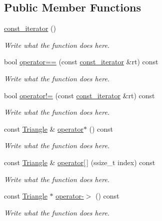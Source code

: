\subsection*{Public Member Functions}
\begin{DoxyCompactItemize}
\item 
\hyperlink{classMesh__t_1_1const__iterator_a12b40b43154b6bed604ee50cf9baa7b6}{const\+\_\+iterator} ()
\begin{DoxyCompactList}\small\item\em Write what the function does here. \end{DoxyCompactList}\item 
bool \hyperlink{classMesh__t_1_1const__iterator_a9f420a6682f245fe125134ff77c79ceb}{operator==} (const \hyperlink{classMesh__t_1_1const__iterator}{const\+\_\+iterator} \&rt) const 
\begin{DoxyCompactList}\small\item\em Write what the function does here. \end{DoxyCompactList}\item 
bool \hyperlink{classMesh__t_1_1const__iterator_aef0e8e475e9ebc4ed2d8312686a65494}{operator!=} (const \hyperlink{classMesh__t_1_1const__iterator}{const\+\_\+iterator} \&rt) const 
\begin{DoxyCompactList}\small\item\em Write what the function does here. \end{DoxyCompactList}\item 
const \hyperlink{structTriangle}{Triangle} \& \hyperlink{classMesh__t_1_1const__iterator_a350801d9318c796df45dc627cfae3030}{operator$\ast$} () const 
\begin{DoxyCompactList}\small\item\em Write what the function does here. \end{DoxyCompactList}\item 
const \hyperlink{structTriangle}{Triangle} \& \hyperlink{classMesh__t_1_1const__iterator_aff99bf979efd14f19f7a5689bae8f387}{operator\mbox{[}$\,$\mbox{]}} (ssize\+\_\+t index) const 
\begin{DoxyCompactList}\small\item\em Write what the function does here. \end{DoxyCompactList}\item 
const \hyperlink{structTriangle}{Triangle} $\ast$ \hyperlink{classMesh__t_1_1const__iterator_a839942103e8fcba845e817f6b1247068}{operator-\/$>$} () const 
\begin{DoxyCompactList}\small\item\em Write what the function does here. \end{DoxyCompactList}\item 

\end{DoxyCompactItemize}

